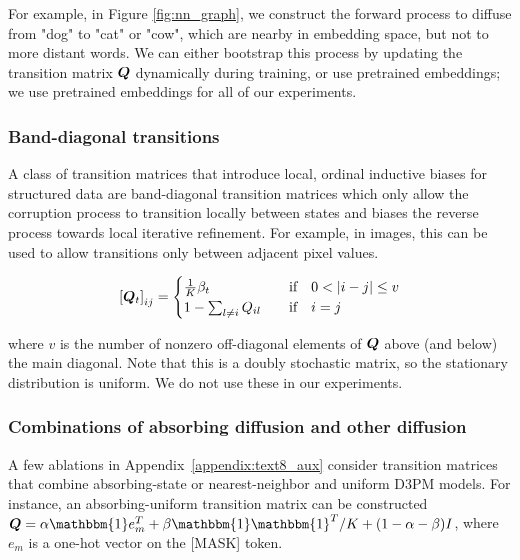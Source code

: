 For example, in Figure \ref{fig:nn_graph}, we construct the forward process to diffuse from "dog" to "cat" or "cow", which are nearby in embedding space, but not to more distant words. We can either bootstrap this process by updating the transition matrix $\boldsymbol{Q}$ dynamically during training, or use pretrained embeddings; we use pretrained embeddings for all of our experiments.

\subsubsection{Band-diagonal transitions} 
A class of transition matrices that introduce local, ordinal inductive biases for structured data are band-diagonal transition matrices which only allow the corruption process to transition locally between states and biases the reverse process towards local iterative refinement. For example, in images, this can be used to allow transitions only between adjacent pixel values.

\begin{align}
    \left[\boldsymbol{Q}_t\right]_{ij} = \begin{cases}
\frac{1}{K} \beta_t \quad &\text{if} \quad  0 < \vert i-j\vert \leq v \\
1 - \sum_{l\neq i} Q_{il} \quad &\text{if} \quad i = j \\
\end{cases}
    \label{eq:uniform_band_diagonal}
\end{align}

where $v$ is the number of nonzero off-diagonal elements of $\boldsymbol{Q}$ above (and below) the main diagonal. Note that this is a doubly stochastic matrix, so the stationary distribution is uniform. We do not use these in our experiments.


\subsubsection{Combinations of absorbing diffusion and other diffusion} 
A few ablations in Appendix~\ref{appendix:text8_aux} consider transition matrices that combine absorbing-state or nearest-neighbor and uniform D3PM models. For instance, an absorbing-uniform transition matrix can be constructed $\bs{Q} = \alpha \mathbbm{1} e_m^T + \beta \mathbbm{1}\mathbbm{1}^T/K + (1 - \alpha - \beta) I$, where $e_m$ is a one-hot vector on the [MASK] token.


